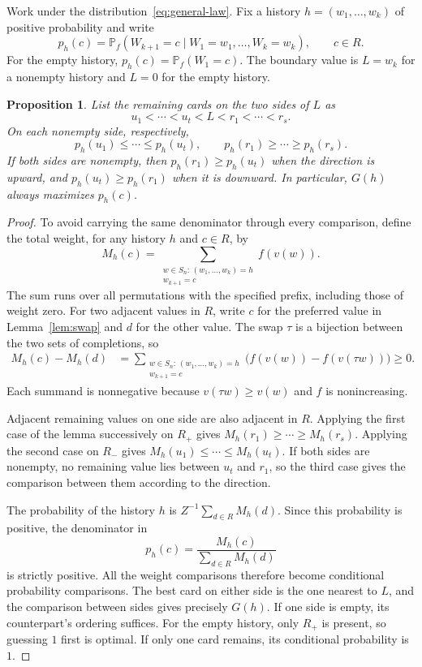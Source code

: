 \documentclass[10pt,a4paper]{amsart}
\numberwithin{equation}{section}
\newtheorem{proposition}[theorem]{Proposition}
\begin{document}
Work under the distribution~\eqref{eq:general-law}. Fix a history $h=(w_1,\ldots,w_k)$ of positive probability and write
\[
 p_h(c)=\mathbb P_f(W_{k+1}=c\mid W_1=w_1,\ldots,W_k=w_k),
 \qquad c\in R.
\]
For the empty history, $p_h(c)=\mathbb P_f(W_1=c)$. The boundary value is $L=w_k$ for a nonempty history and $L=0$ for the empty history.

\begin{proposition}\label{prop:ordering}
List the remaining cards on the two sides of $L$ as
\[
 u_1<\cdots<u_t<L<r_1<\cdots<r_s.
\]
On each nonempty side, respectively,
\begin{equation}\label{eq:side-order}
 p_h(u_1)\le\cdots\le p_h(u_t),\qquad
 p_h(r_1)\ge\cdots\ge p_h(r_s).
\end{equation}
If both sides are nonempty, then $p_h(r_1)\ge p_h(u_t)$ when the direction is upward, and $p_h(u_t)\ge p_h(r_1)$ when it is downward. In particular, $G(h)$ always maximizes $p_h(c)$.
\end{proposition}
\begin{proof}
To avoid carrying the same denominator through every comparison, define the total weight, for any history $h$ and $c\in R$, by
\[
 M_h(c)=\sum_{\substack{w\in S_n:\,(w_1,\ldots,w_k)=h\\ w_{k+1}=c}}f(v(w)).
\]
The sum runs over all permutations with the specified prefix, including those of weight zero. For two adjacent values in $R$, write $c$ for the preferred value in Lemma~\ref{lem:swap} and $d$ for the other value. The swap $\tau$ is a bijection between the two sets of completions, so
\begin{align}
 M_h(c)-M_h(d)
 &=\sum_{\substack{w\in S_n:\,(w_1,\ldots,w_k)=h\\ w_{k+1}=c}}
 \bigl(f(v(w))-f(v(\tau w))\bigr)\ge0.\label{eq:weight-difference}
\end{align}
Each summand is nonnegative because $v(\tau w)\ge v(w)$ and $f$ is nonincreasing.

Adjacent remaining values on one side are also adjacent in $R$. Applying the first case of the lemma successively on $R_+$ gives $M_h(r_1)\ge\cdots\ge M_h(r_s)$. Applying the second case on $R_-$ gives $M_h(u_1)\le\cdots\le M_h(u_t)$. If both sides are nonempty, no remaining value lies between $u_t$ and $r_1$, so the third case gives the comparison between them according to the direction.

The probability of the history $h$ is $Z^{-1}\sum_{d\in R}M_h(d)$. Since this probability is positive, the denominator in
\begin{equation}\label{eq:conditional}
 p_h(c)=\frac{M_h(c)}{\sum_{d\in R}M_h(d)}
\end{equation}
is strictly positive. All the weight comparisons therefore become conditional probability comparisons. The best card on either side is the one nearest to $L$, and the comparison between sides gives precisely $G(h)$. If one side is empty, its counterpart's ordering suffices. For the empty history, only $R_+$ is present, so guessing $1$ first is optimal. If only one card remains, its conditional probability is $1$.
\end{proof}
\end{document}
